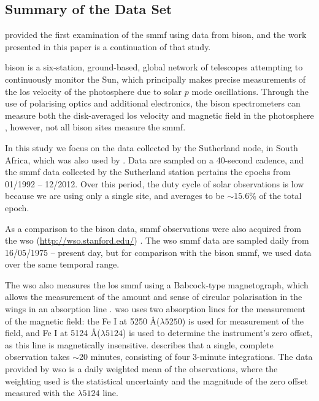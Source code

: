 \subsection{Summary of the Data Set}

\citet{chaplin_studies_2003} provided the first examination of the \gls{smmf} using data from \gls{bison}, and the work presented in this paper is a continuation of that study.

\gls{bison} is a six-station, ground-based, global network of telescopes attempting to continuously monitor the Sun, which principally makes precise measurements of the \gls{los} velocity of the photosphere due to solar $p$ mode oscillations. Through the use of polarising optics and additional electronics, the \gls{bison} spectrometers can measure both the disk-averaged \gls{los} velocity and magnetic field in the photosphere \citep{chaplin_studies_2003}, however, not all \gls{bison} sites measure the \gls{smmf}. 

In this study we focus on the data collected by the Sutherland node, in South Africa, which was also used by \cite{chaplin_studies_2003}. Data are sampled on a 40-second cadence, and the \gls{smmf} data collected by the Sutherland station pertains the epochs from 01/1992 -- 12/2012. Over this period, the duty cycle of solar observations is low because we are using only a single site, and averages to be $\sim 15.6\%$ of the total epoch.

As a comparison to the \gls{bison} data, \gls{smmf} observations were also acquired from the \gls{wso} (\url{http://wso.stanford.edu/}) \citep{scherrer_mean_1977-1}. The \gls{wso} \gls{smmf} data are sampled daily from 16/05/1975 -- present day, but for comparison with the \gls{bison} \gls{smmf}, we used data over the same temporal range.

The \gls{wso} also measures the \gls{los} \gls{smmf} using a Babcock-type magnetograph, which allows the measurement of the amount and sense of circular polarisation in the wings in an absorption line \citep{scherrer_mean_1977}. \gls{wso} uses two absorption lines for the measurement of the magnetic field: the Fe I at 5250 \AA ($\lambda 5250$) is used for measurement of the field, and Fe I at 5124 \AA ($\lambda 5124$) is used to determine the instrument's zero offset, as this line is magnetically insensitive. \cite{scherrer_mean_1977} describes that a single, complete observation takes $\sim$20 minutes, consisting of four 3-minute integrations. The data provided by \gls{wso} is a daily weighted mean of the observations, where the weighting used is the statistical uncertainty and the magnitude of the zero offset measured with the $\lambda 5124$ line.


